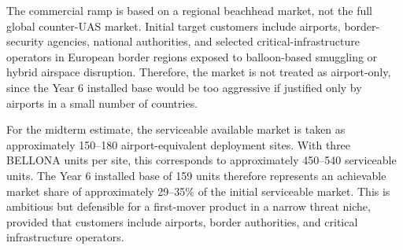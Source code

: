 The commercial ramp is based on a regional beachhead market, not the full global counter-UAS market. Initial target customers include airports, border-security agencies, national authorities, and selected critical-infrastructure operators in European border regions exposed to balloon-based smuggling or hybrid airspace disruption. Therefore, the market is not treated as airport-only, since the Year 6 installed base would be too aggressive if justified only by airports in a small number of countries.

For the midterm estimate, the serviceable available market is taken as approximately 150--180 airport-equivalent deployment sites. With three BELLONA units per site, this corresponds to approximately 450--540 serviceable units. The Year 6 installed base of 159 units therefore represents an achievable market share of approximately 29--35\% of the initial serviceable market. This is ambitious but defensible for a first-mover product in a narrow threat niche, provided that customers include airports, border authorities, and critical infrastructure operators.

